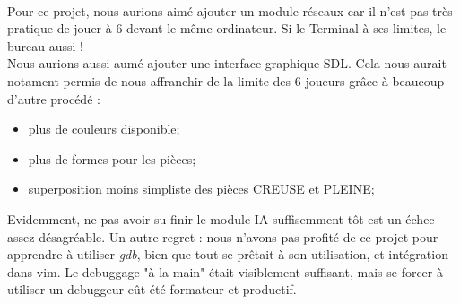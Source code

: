 \documentclass{report}
\begin{document}
    \paragraph*{} %
     Pour ce projet, nous aurions aimé ajouter un module réseaux car il n'est pas très pratique de jouer à 6 devant le même ordinateur. Si le Terminal à ses limites, le bureau aussi !\\
     Nous aurions aussi aumé ajouter une interface graphique SDL. Cela nous aurait notament permis de nous affranchir de la limite des 6 joueurs grâce à beaucoup d'autre procédé : \\
     \begin{itemize}
     	\item plus de couleurs disponible;
	\item plus de formes pour les pièces;
	\item superposition moins simpliste des pièces CREUSE et PLEINE;
     \end{itemize}
     Evidemment, ne pas avoir su finir le module IA suffisemment tôt est un échec assez désagréable.
     Un autre regret : nous n'avons pas profité de ce projet pour apprendre à utiliser \textit{gdb}, bien que tout se prêtait à son utilisation, et intégration dans vim. 
        Le debuggage "à la main" était visiblement suffisant, mais se forcer à utiliser un debuggeur eût été formateur et productif.
    \newpage
\end{document}

